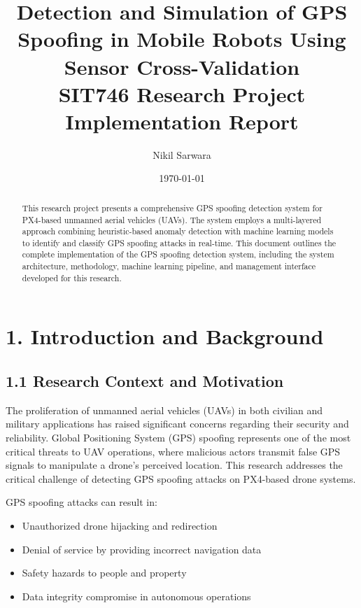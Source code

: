 \documentclass[12pt,a4paper]{article}
\title{\textbf{Detection and Simulation of GPS Spoofing in Mobile Robots Using Sensor Cross-Validation}\\SIT746 Research Project Implementation Report}
\author{Nikil Sarwara}
\date{\today}
\begin{document}
\maketitle

\begin{abstract}
This research project presents a comprehensive GPS spoofing detection system for PX4-based unmanned aerial vehicles (UAVs). The system employs a multi-layered approach combining heuristic-based anomaly detection with machine learning models to identify and classify GPS spoofing attacks in real-time. This document outlines the complete implementation of the GPS spoofing detection system, including the system architecture, methodology, machine learning pipeline, and management interface developed for this research.
\end{abstract}

\newpage

\tableofcontents

\newpage

\section{1. Introduction and Background}

\subsection{1.1 Research Context and Motivation}

The proliferation of unmanned aerial vehicles (UAVs) in both civilian and military applications has raised significant concerns regarding their security and reliability. Global Positioning System (GPS) spoofing represents one of the most critical threats to UAV operations, where malicious actors transmit false GPS signals to manipulate a drone's perceived location. This research addresses the critical challenge of detecting GPS spoofing attacks on PX4-based drone systems.

GPS spoofing attacks can result in:
\begin{itemize}
    \item Unauthorized drone hijacking and redirection
    \item Denial of service by providing incorrect navigation data
    \item Safety hazards to people and property
    \item Data integrity compromise in autonomous operations
\end{itemize}
\end{document}
